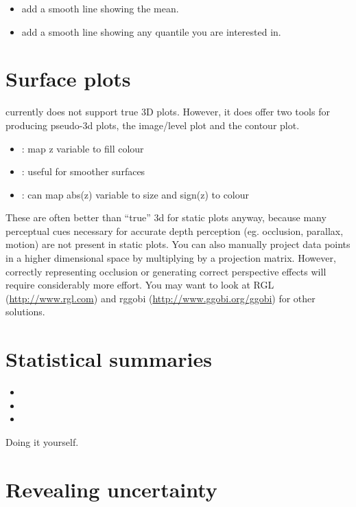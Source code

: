 \begin{itemize}
	\item {} add a smooth line showing the mean.
	\item {} add a smooth line showing any quantile you are interested in.
\end{itemize}

\section{Surface plots}
\label{sec:surface}

\ggplot currently does not support true 3D plots.  However, it does offer two tools for producing pseudo-3d plots, the image/level plot and the contour plot.  

\begin{itemize}
	\item {}: map z variable to fill colour
	\item {}: useful for smoother surfaces
	\item {}: can map abs(z) variable to size and sign(z) to colour
\end{itemize}

These are often better than ``true'' 3d for static plots anyway, because many perceptual cues necessary for accurate depth perception (eg. occlusion, parallax, motion) are not present in static plots.  You can also manually project data points in a higher dimensional space by multiplying by a projection matrix.  However, correctly representing occlusion or generating correct perspective effects will require considerably more effort.  You may want to look at RGL (\url{http://www.rgl.com}) and rggobi (\url{http://www.ggobi.org/ggobi}) for other solutions.

\section{Statistical summaries}
\label{sec:summary}

\begin{itemize}
  \item {}
  \item {}
  \item {}
\end{itemize}

Doing it yourself.

\section{Revealing uncertainty}
\label{sec:uncertainty}

